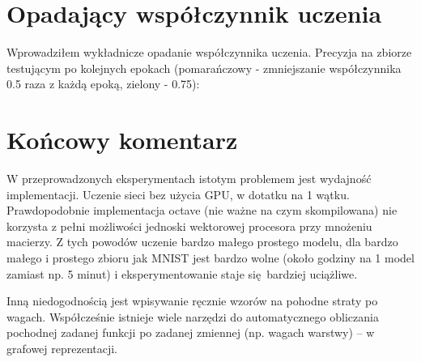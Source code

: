 \documentclass[a4paper]{article}
\begin{document}
\section{Opadający współczynnik uczenia}

Wprowadziłem wykładnicze opadanie współczynnika uczenia.
Precyzja na zbiorze testującym po kolejnych epokach
(pomarańczowy - zmniejszanie współczynnika 0.5 raza z każdą epoką,
zielony - 0.75):
\begin{center}
\end{center}

\section{Końcowy komentarz}

W przeprowadzonych eksperymentach istotym problemem jest wydajność implementacji.
Uczenie sieci bez użycia GPU, w dotatku na 1 wątku. 
Prawdopodobnie implementacja octave (nie ważne na czym skompilowana)
nie korzysta z pełni możliwości jednoski wektorowej procesora przy mnożeniu macierzy.
Z tych powodów uczenie bardzo małego prostego modelu,
dla bardzo małego i prostego zbioru jak MNIST jest bardzo wolne
(około godziny na 1 model zamiast np. 5 minut)
i eksperymentowanie staje się bardziej uciążliwe.

Inną niedogodnością jest wpisywanie ręcznie wzorów na pohodne straty po wagach.
Współcześnie istnieje wiele narzędzi do automatycznego obliczania pochodnej
zadanej funkcji po zadanej zmiennej (np. wagach warstwy) -- w grafowej reprezentacji.
\end{document}
